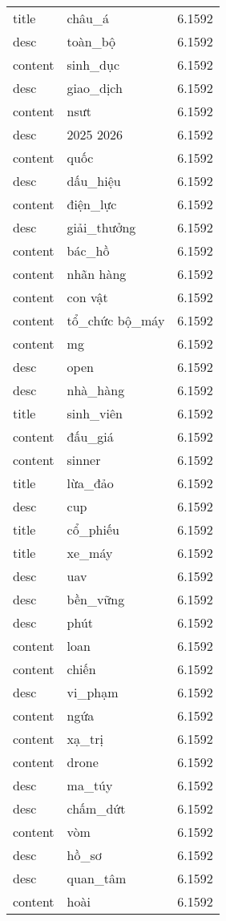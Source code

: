 \documentclass{article}
\begin{document}
\begin{tabular}{lll}
title & châu\_á & 6.1592\\
desc & toàn\_bộ & 6.1592\\
content & sinh\_dục & 6.1592\\
desc & giao\_dịch & 6.1592\\
content & nsưt & 6.1592\\
desc & 2025 2026 & 6.1592\\
content & quốc & 6.1592\\
desc & dấu\_hiệu & 6.1592\\
content & điện\_lực & 6.1592\\
desc & giải\_thưởng & 6.1592\\
content & bác\_hồ & 6.1592\\
content & nhãn hàng & 6.1592\\
content & con vật & 6.1592\\
content & tổ\_chức bộ\_máy & 6.1592\\
content & mg & 6.1592\\
desc & open & 6.1592\\
desc & nhà\_hàng & 6.1592\\
title & sinh\_viên & 6.1592\\
content & đấu\_giá & 6.1592\\
content & sinner & 6.1592\\
title & lừa\_đảo & 6.1592\\
desc & cup & 6.1592\\
title & cổ\_phiếu & 6.1592\\
title & xe\_máy & 6.1592\\
desc & uav & 6.1592\\
desc & bền\_vững & 6.1592\\
desc & phút & 6.1592\\
content & loan & 6.1592\\
content & chiến & 6.1592\\
desc & vi\_phạm & 6.1592\\
content & ngứa & 6.1592\\
content & xạ\_trị & 6.1592\\
content & drone & 6.1592\\
desc & ma\_túy & 6.1592\\
desc & chấm\_dứt & 6.1592\\
content & vòm & 6.1592\\
desc & hồ\_sơ & 6.1592\\
desc & quan\_tâm & 6.1592\\
content & hoài & 6.1592\\

\end{tabular}
\end{document}
